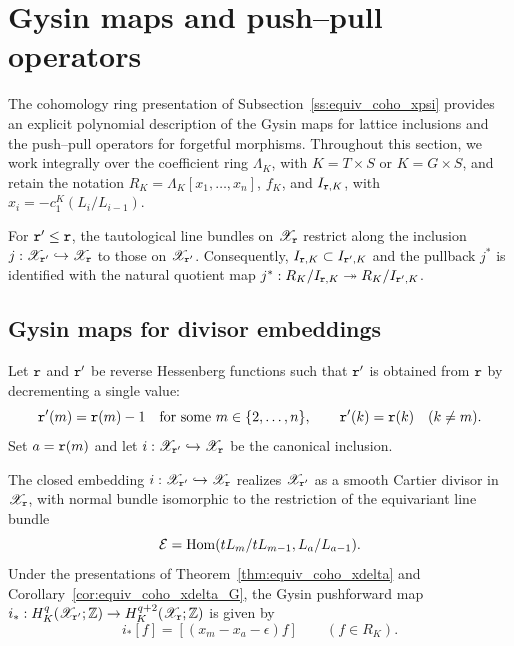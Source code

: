\section{Gysin maps and push--pull operators}\label{sec:pushpull}

The cohomology ring presentation of Subsection~\ref{ss:equiv_coho_xpsi} provides
an explicit polynomial description of the Gysin maps for lattice inclusions
and the push--pull operators for forgetful morphisms.
Throughout this section, we work integrally over the coefficient ring $\Lambda_K$,
with $K=T\times S$ or $K=G\times S$, and retain the notation
$R_K=\Lambda_K[x_1,\dots,x_n]$, $f_K$, and $I_{\mathtt r,K}$, with $x_i=-c_1^K(L_i/L_{i-1})$.

For $\mathtt r'\leq\mathtt r$, the tautological line bundles on $\mathscr X_{\mathtt r}$ restrict along the inclusion $j:\mathscr X_{\mathtt r'}\hookrightarrow\mathscr X_{\mathtt r}$ to those on $\mathscr X_{\mathtt r'}$. Consequently, $I_{\mathtt r,K}\subset I_{\mathtt r',K}$ and the pullback $j^*$ is identified with the natural quotient map $j^*:R_K/I_{\mathtt r,K}\twoheadrightarrow R_K/I_{\mathtt r',K}$.

\subsection{Gysin maps for divisor embeddings}

Let $\mathtt r$ and $\mathtt r'$ be reverse Hessenberg functions such that $\mathtt r'$ is obtained
from $\mathtt r$ by decrementing a single value:
\[
  \mathtt r'(m)=\mathtt r(m)-1 \quad\text{for some } m\in\{2,\dots,n\},
  \qquad \mathtt r'(k)=\mathtt r(k) \quad(k\neq m).
\]
Set $a=\mathtt r(m)$ and let $i:\mathscr X_{\mathtt r'}\hookrightarrow\mathscr X_{\mathtt r}$
be the canonical inclusion.

\begin{proposition}\label{prop:inclusion_gysin}
The closed embedding $i:\mathscr X_{\mathtt r'}\hookrightarrow\mathscr X_{\mathtt r}$ realizes
$\mathscr X_{\mathtt r'}$ as a smooth Cartier divisor in $\mathscr X_{\mathtt r}$, with normal bundle
isomorphic to the restriction of the equivariant line bundle
\[
  \mathcal E=\operatorname{Hom}(tL_m/tL_{m-1},L_a/L_{a-1}).
\]
Under the presentations of Theorem~\ref{thm:equiv_coho_xdelta} and Corollary~\ref{cor:equiv_coho_xdelta_G}, the Gysin pushforward map
$i_*:H_K^q(\mathscr X_{\mathtt r'};\mathbb Z)\to H_K^{q+2}(\mathscr X_{\mathtt r};\mathbb Z)$ is given by
\[
  i_*[f]=[(x_m-x_a-\epsilon)f] \qquad (f\in R_K).
\]
\end{proposition}

